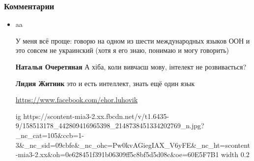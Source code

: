  
 
 
 
 
\clearpage
\subsubsection{Комментарии}
\label{sec:18_06_2020.fb.zharkih_ekaterina.1.mova_jazyk.cmt}

\begin{itemize}
\item aa





У меня всё проще: говорю на одном из шести международных языков ООН и это
совсем не украинский (хотя я его знаю, понимаю и могу говорить)

\textbf{Наталья Очеретяная} А хіба, коли вивчаєш мову, інтелект не розвивається?

\textbf{Лидия Житник} это и есть интеллект, знать ещё один язык

\url{https://www.facebook.com/ehor.luhovik}\par
\ifcmt
  ig https://scontent-mia3-2.xx.fbcdn.net/v/t1.6435-9/158513178_442809416965398_2148738451334202769_n.jpg?_nc_cat=105&ccb=1-3&_nc_sid=09cbfe&_nc_ohc=Pw0kvAGiegIAX_V6yFE&_nc_ht=scontent-mia3-2.xx&oh=0e628451f391b06309ff5c8bf5d5d08c&oe=60E5F7B1
  width 0.2
\fi


\end{itemize}
